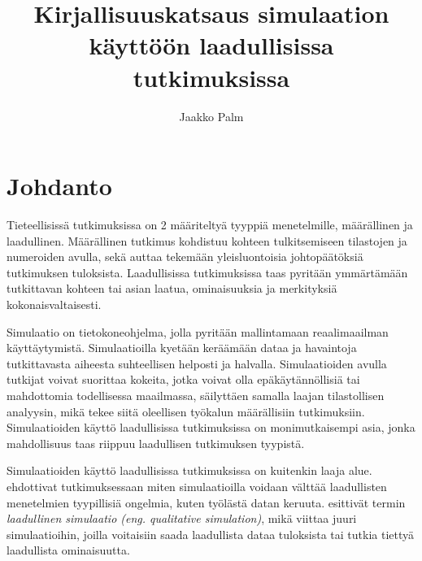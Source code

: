 \documentclass[utf8]{gradu3}
\begin{document}
\title{Kirjallisuuskatsaus simulaation käyttöön laadullisissa tutkimuksissa}
\abstract{%
  
}

\author{Jaakko Palm}

\maketitle

\mainmatter

\chapter{Johdanto}

Tieteellisissä tutkimuksissa on 2 määriteltyä tyyppiä menetelmille, määrällinen ja laadullinen. Määrällinen tutkimus kohdistuu kohteen tulkitsemiseen tilastojen ja numeroiden avulla, sekä auttaa tekemään yleisluontoisia johtopäätöksiä tutkimuksen tuloksista. Laadullisissa tutkimuksissa taas pyritään ymmärtämään tutkittavan kohteen tai asian laatua, ominaisuuksia ja merkityksiä kokonaisvaltaisesti. 

Simulaatio on tietokoneohjelma, jolla pyritään mallintamaan reaalimaailman käyttäytymistä. Simulaatioilla kyetään keräämään dataa ja havaintoja tutkittavasta aiheesta suhteellisen helposti ja halvalla. Simulaatioiden avulla tutkijat voivat suorittaa kokeita, jotka voivat olla epäkäytännöllisiä tai mahdottomia todellisessa maailmassa, säilyttäen samalla laajan tilastollisen analyysin, mikä tekee siitä oleellisen työkalun määrällisiin tutkimuksiin. Simulaatioiden käyttö laadullisissa tutkimuksissa on monimutkaisempi asia, jonka mahdollisuus taas riippuu laadullisen tutkimuksen tyypistä. 

Simulaatioiden käyttö laadullisissa tutkimuksissa on kuitenkin laaja alue. \cite{eldabi2002quantitative} ehdottivat tutkimuksessaan miten simulaatioilla voidaan välttää laadullisten menetelmien tyypillisiä ongelmia, kuten työlästä datan keruuta. \cite{kuipers1986qualitative} esittivät termin \textit{laadullinen simulaatio (eng. qualitative simulation)}, mikä viittaa juuri simulaatioihin, joilla voitaisiin saada laadullista dataa tuloksista tai tutkia tiettyä laadullista ominaisuutta. 
\end{document}
